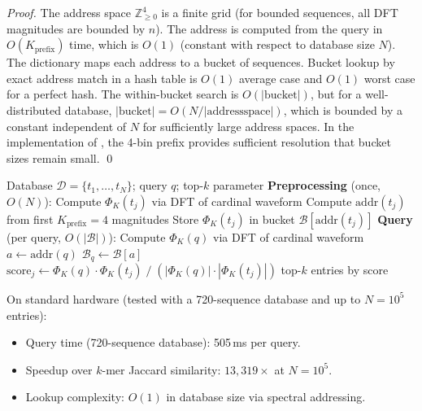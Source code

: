 \begin{proof}
The address space $\mathbb{Z}_{\geq 0}^4$ is a finite grid (for bounded sequences,
all DFT magnitudes are bounded by $n$). The address is computed from the query
in $O(K_{\mathrm{prefix}})$ time, which is $O(1)$ (constant with respect to
database size $N$). The dictionary maps each address to a bucket of sequences.
Bucket lookup by exact address match in a hash table is $O(1)$ average case
and $O(1)$ worst case for a perfect hash. The within-bucket search is
$O(|\mathrm{bucket}|)$, but for a well-distributed database,
$|\mathrm{bucket}| = O(N / |\mathrm{address space}|)$, which is bounded by a
constant independent of $N$ for sufficiently large address spaces. In
the implementation of \citet{Sachikonye2025_Shader}, the 4-bin prefix provides
sufficient resolution that bucket sizes remain small. \qed
\end{proof}

\begin{algorithm}
\caption{Spectral Homology Search}
\label{alg:spectral_search}
\begin{algorithmic}[1]
\Require Database $\mathcal{D} = \{t_1, \ldots, t_N\}$; query $q$; top-$k$ parameter
\Statex \textbf{Preprocessing} (once, $O(N)$):
  \State Compute $\Phi_K(t_j)$ via DFT of cardinal waveform
  \State Compute $\mathrm{addr}(t_j)$ from first $K_{\mathrm{prefix}}=4$ magnitudes
  \State Store $\Phi_K(t_j)$ in bucket $\mathcal{B}[\mathrm{addr}(t_j)]$
\EndFor
\Statex \textbf{Query} (per query, $O(|\mathcal{B}|)$):
\State Compute $\Phi_K(q)$ via DFT of cardinal waveform 
\State $a \gets \mathrm{addr}(q)$ 
\State $\mathcal{B}_q \gets \mathcal{B}[a]$ 
  \State $\mathrm{score}_j \gets \Phi_K(q) \cdot \Phi_K(t_j) \;/\; (|\Phi_K(q)| \cdot |\Phi_K(t_j)|)$
\EndFor
\State \Return top-$k$ entries by score
\end{algorithmic}
\end{algorithm}

\begin{keyresult}
On standard hardware (tested with a 720-sequence database and up to
$N = 10^5$ entries):
\begin{itemize}
  \item Query time (720-sequence database): 505\,ms per query.
  \item Speedup over $k$-mer Jaccard similarity: $13,\!319\times$ at $N=10^5$.
  \item Lookup complexity: $O(1)$ in database size via spectral addressing.
\end{itemize}
\end{keyresult}


